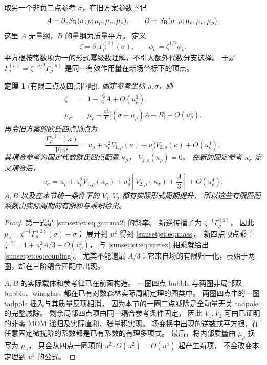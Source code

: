 \documentclass[11pt,a4paper,oneside]{ctexart}
\theoremstyle{cnplain}
\newtheorem{theorem}{定理}[section]
\theoremstyle{definition}
\theoremstyle{remark}
\numberwithin{equation}{section}
\begin{document}
取另一个非负二点参考 $\sigma$，在旧方案参数下记
\begin{equation}\label{sunsetjet:eq:AB}
 A=\partial_zS_{\mathrm R}(\sigma;\rho;\mu_\rho,\mu_\rho,\mu_\rho),\qquad
 B=S_{\mathrm R}(\sigma;\rho;\mu_\rho,\mu_\rho,\mu_\rho).
\end{equation}
这里 $A$ 无量纲，$B$ 的量纲为质量平方。
定义
\[
 \zeta=\partial_z\Gamma^{(2)}_\rho(\sigma),\qquad
 \phi_\sigma=\zeta^{1/2}\phi_\rho.
\]
平方根按常数项为一的形式幂级数理解，不引入额外代数分支选择。
于是 $\Gamma^{(n)}_\sigma=\zeta^{-n/2}\Gamma^{(n)}_\rho$
是同一有效作用量在新场坐标下的顶点。

\begin{theorem}[有限二点及四点匹配]\label{sunsetjet:thm:matching}
固定参考坐标 $\rho,\sigma$，则
\begin{align}
 \zeta&=1-\frac{u_\rho^2}{6}A+O(u_\rho^3),\label{sunsetjet:eq:zeta}\\
 \mu_\sigma&=\mu_\rho+
       \frac{u_\rho^2}{6}\bigl[(\sigma+\mu_\rho)A-B\bigr]
       +O(u_\rho^3).\label{sunsetjet:eq:mass}
\end{align}
再令旧方案的欧氏四点顶点为
\begin{equation}\label{sunsetjet:eq:vertex}
 \frac{\Gamma^{(4)}_\rho(\kappa)}{16\pi^2}
   =u_\rho+u_\rho^2V_{1,\rho}(\kappa)
            +u_\rho^3V_{2,\rho}(\kappa)+O(u_\rho^4),
\end{equation}
其耦合参考为固定代数欧氏四点配置 $\kappa_\rho$，
$V_{j,\rho}(\kappa_\rho)=0$。
在新的固定参考 $\kappa_\sigma$ 定义耦合后，
\begin{equation}\label{sunsetjet:eq:coupling}
 u_\sigma=u_\rho+u_\rho^2V_{1,\rho}(\kappa_\sigma)
    +u_\rho^3\left[V_{2,\rho}(\kappa_\sigma)+\frac A3\right]
    +O(u_\rho^4).
\end{equation}
$A,B$ 以及在本节统一条件下的 $V_1,V_2$ 都有实际形式周期提升，
所以这些有限匹配系数由实际周期的有限和与乘积给出。
\end{theorem}
\begin{proof}
第一式是 \eqref{sunsetjet:eq:gamma2} 的斜率。
新逆传播子为 $\zeta^{-1}\Gamma^{(2)}_\rho$，
因此 $\mu_\sigma=\zeta^{-1}\Gamma^{(2)}_\rho(\sigma)-\sigma$；
展开到 $u^2$ 得到 \eqref{sunsetjet:eq:mass}。
新四点顶点乘上 $\zeta^{-2}=1+u_\rho^2 A/3+O(u_\rho^3)$，
与 \eqref{sunsetjet:eq:vertex} 相乘就给出 \eqref{sunsetjet:eq:coupling}。
尤其不能遗漏 $A/3$：它来自场的有限归一化，虽始于两圈，却在三阶耦合匹配中出现。

$A,B$ 的实际载体和参考律已在前面构造。
一圈四点 bubble 与两圈非局部双 bubble、wineglass 都在已有对数森林实际周期定理的图类中。
两圈四点中的一圈 tadpole 插入与其质量反项相消，
因为本节的一圈二点减除是全动量无关 tadpole 的完整减除。
剩余局部四点项由同一耦合参考条件固定，
因此 $V_1,V_2$ 可由已证明的非零 MOM 递归及实际直和、张量积实现。
场变换中出现的逆数或平方根，在任意固定微扰阶的系数都是已有系数的有理多项式。
最后，将内部质量由 $\mu_\rho$ 换写为 $\mu_\sigma$，
只会从四点一圈项的 $u^2\cdot O(u^2)=O(u^4)$ 起产生新项，
不会改变本定理到 $u^3$ 的公式。
\end{proof}
\end{document}
